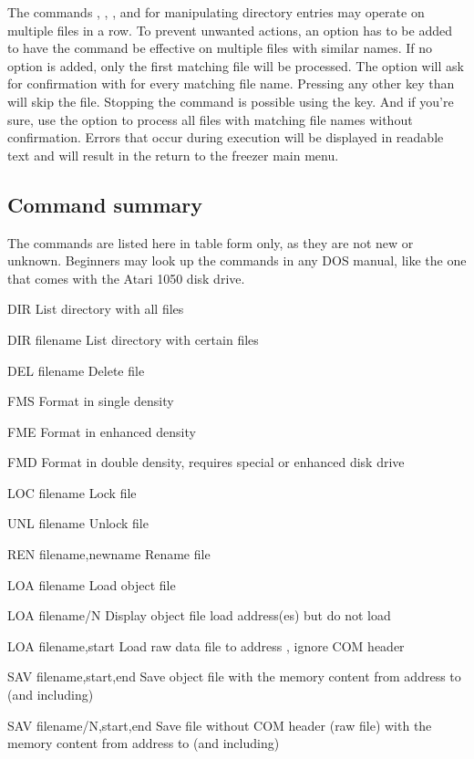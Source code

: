 The commands , , , and  for manipulating
directory entries may operate on multiple files in a row. To prevent unwanted
actions, an option has to be added to have the command be effective on multiple
files with similar names. If no option is added, only the first matching file
will be processed. The option  will ask for confirmation with 
for every matching file name. Pressing any other key than  will skip
the file. Stopping the command is possible using the  key.
And if you're sure, use the option  to process all files with matching
file names without confirmation.
Errors that occur during execution will be displayed in readable text and will
result in the return to the freezer main menu.

\subsection{Command summary}
The commands are listed here in table form only, as they are not new or
unknown. Beginners may look up the commands in any DOS manual, like the one that
comes with the Atari 1050 disk drive.

\begin{fcmdlist}
\item[DIR]
List directory with all files
\item[DIR filename]
List directory with certain files
\item[DEL filename]
Delete file 
\item[FMS]
Format in single density
\item[FME]
Format in enhanced density
\item[FMD]
Format in double density, requires special or enhanced disk drive
\item[LOC filename]
Lock file
\item[UNL filename]
Unlock file
\item[REN filename,newname]
Rename file
\item[LOA filename]
Load object file
\item[LOA filename/N]
Display object file load address(es) but do not load
\item[LOA filename,start]
Load raw data file to address , ignore COM header
\item[SAV filename,start,end]
Save object file with the memory content from address  to
(and including) 
\item[SAV filename/N,start,end]
Save file without COM header (raw file) with the memory content from address  to
(and including) 
\end{fcmdlist}

